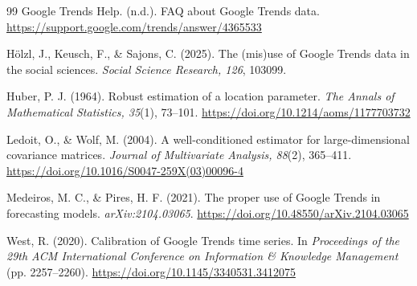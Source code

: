 \documentclass[12pt,a4paper,oneside]{article}
\begin{document}
\begin{thebibliography}{99}
Google Trends Help. (n.d.).
FAQ about Google Trends data.
\url{https://support.google.com/trends/answer/4365533}

Hölzl, J., Keusch, F., \& Sajons, C. (2025).
The (mis)use of Google Trends data in the social sciences.
\textit{Social Science Research, 126}, 103099.

Huber, P. J. (1964).
Robust estimation of a location parameter.
\textit{The Annals of Mathematical Statistics, 35}(1), 73--101.
\url{https://doi.org/10.1214/aoms/1177703732}

Ledoit, O., \& Wolf, M. (2004).
A well-conditioned estimator for large-dimensional covariance matrices.
\textit{Journal of Multivariate Analysis, 88}(2), 365--411.
\url{https://doi.org/10.1016/S0047-259X(03)00096-4}

Medeiros, M. C., \& Pires, H. F. (2021).
The proper use of Google Trends in forecasting models.
\textit{arXiv:2104.03065}.
\url{https://doi.org/10.48550/arXiv.2104.03065}

West, R. (2020).
Calibration of Google Trends time series.
In \textit{Proceedings of the 29th ACM International Conference on Information \& Knowledge Management} (pp. 2257--2260).
\url{https://doi.org/10.1145/3340531.3412075}

\end{thebibliography}
\end{document}
